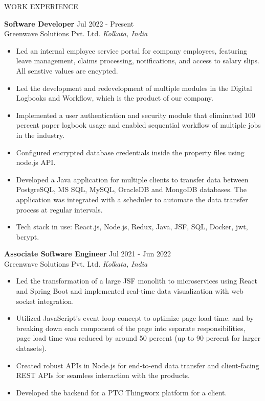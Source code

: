 \documentclass{resume} %
\begin{document}
\begin{rSection}{WORK EXPERIENCE}

\textbf{Software Developer} \hfill Jul 2022 - Present\\
Greenwave Solutions Pvt. Ltd. \hfill \textit{Kolkata, India}
 \begin{itemize}
    \itemsep -3pt {} 
    \item Led an internal employee service portal for company employees, featuring leave management, claims processing, notifications, and access to salary slips. All senstive values are encypted.
     \item Led the development and redevelopment of multiple modules in the Digital Logbooks and Workflow, which is the product of our company.
     \item Implemented a user authentication and security module that eliminated 100 percent paper logbook usage and enabled sequential workflow of multiple jobs in the industry.
     \item Configured encrypted database credentials inside the property files using node.js API.
     \item Developed a Java application for multiple clients to transfer data between PostgreSQL, 
MS SQL, MySQL, OracleDB and MongoDB databases. The application was integrated with a scheduler to 
automate the data transfer process at regular intervals.

    \item Tech stack in use: React.js, Node.js, Redux, Java, JSF, SQL, Docker, jwt, bcrypt.
 \end{itemize}
 
\textbf{Associate Software Engineer} \hfill Jul 2021 - Jun 2022\\
Greenwave Solutions Pvt. Ltd. \hfill \textit{Kolkata, India}
 \begin{itemize}
    \itemsep -3pt {} 
     \item Led the transformation of a large JSF monolith to microservices using React and Spring Boot
    and implemented real-time data visualization with web socket integration.
\item Utilized JavaScript's event loop concept to optimize page load time.
and by breaking down each component of the page into separate responsibilities, page load time was reduced by around 50 percent (up to 90 percent for larger datasets).

    \item Created robust APIs in Node.js for end-to-end data transfer and client-facing REST APIs for seamless interaction with the products.
     \item Developed the backend for a PTC Thingworx platform for a client.
   

\end{itemize}
\end{rSection}
\end{document}
